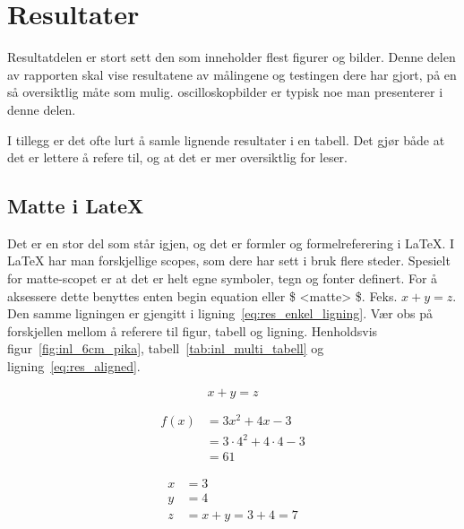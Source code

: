 \section{Resultater}

Resultatdelen er stort sett den som inneholder flest figurer og bilder. 
Denne delen av rapporten skal vise resultatene av målingene og testingen dere har gjort,
på en så oversiktlig måte som mulig. oscilloskopbilder er typisk noe man presenterer i denne delen.

I tillegg er det ofte lurt å samle lignende resultater i en tabell. Det gjør både at det er lettere
å refere til, og at det er mer oversiktlig for leser.

\subsection{Matte i LateX}

Det er en stor del som står igjen, og det er formler og formelreferering i LaTeX. I LaTeX har man forskjellige scopes,
som dere har sett i bruk flere steder. Spesielt for matte-scopet er at det er helt egne symboler, tegn og fonter definert.
For å aksessere dette benyttes enten begin equation eller \$ <matte> \$. Feks. $x+y=z$. Den samme ligningen er gjengitt i ligning~\eqref{eq:res_enkel_ligning}.
Vær obs på forskjellen mellom å referere til figur, tabell og ligning. Henholdsvis figur~\ref{fig:inl_6cm_pika}, tabell~\ref{tab:inl_multi_tabell} og ligning~\eqref{eq:res_aligned}.

\begin{equation}
    x + y = z
    \label{eq:res_enkel_ligning}
\end{equation}


\begin{equation}
    \begin{aligned}
        f(x) &= 3x^2 + 4x - 3 \\
            &= 3 \cdot 4^2 + 4 \cdot 4 - 3 \\
            &= 61
    \end{aligned}
    \label{eq:res_aligned}
\end{equation}

\begin{align}
    \label{eq:res_rad1}
    x &= 3 \\
    \label{eq:res_rad2}
    y &= 4 \\
    \label{eq:res_rad3}
    z &= x + y = 3 + 4 = 7
\end{align}

